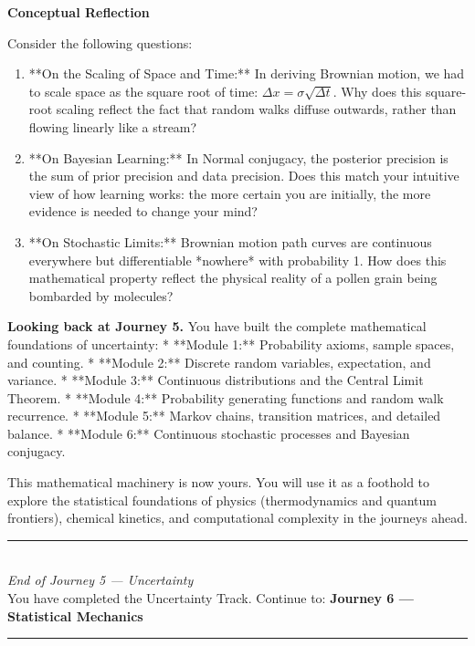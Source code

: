 \documentclass[12pt, a4paper]{article}
\begin{document}
\begin{reflectionbox}
\textbf{Conceptual Reflection}

Consider the following questions:
\begin{enumerate}
  \item **On the Scaling of Space and Time:** In deriving Brownian motion, we had to scale space as the square root of time: $\Delta x = \sigma \sqrt{\Delta t}$. Why does this square-root scaling reflect the fact that random walks diffuse outwards, rather than flowing linearly like a stream?
  \item **On Bayesian Learning:** In Normal conjugacy, the posterior precision is the sum of prior precision and data precision. Does this match your intuitive view of how learning works: the more certain you are initially, the more evidence is needed to change your mind?
  \item **On Stochastic Limits:** Brownian motion path curves are continuous everywhere but differentiable *nowhere* with probability 1. How does this mathematical property reflect the physical reality of a pollen grain being bombarded by molecules?
\end{enumerate}
\end{reflectionbox}

\medskip
\noindent\textbf{Looking back at Journey 5.}
You have built the complete mathematical foundations of uncertainty:
* **Module 1:** Probability axioms, sample spaces, and counting.
* **Module 2:** Discrete random variables, expectation, and variance.
* **Module 3:** Continuous distributions and the Central Limit Theorem.
* **Module 4:** Probability generating functions and random walk recurrence.
* **Module 5:** Markov chains, transition matrices, and detailed balance.
* **Module 6:** Continuous stochastic processes and Bayesian conjugacy.

This mathematical machinery is now yours. You will use it as a foothold to explore the statistical foundations of physics (thermodynamics and quantum frontiers), chemical kinetics, and computational complexity in the journeys ahead.

\vspace{1.4cm}
\begin{center}
{\color{MidBlue}\rule{0.5\linewidth}{0.8pt}}\\[6pt]
{\small\color{DarkGrey}\textit{End of Journey 5 --- Uncertainty}}\\[4pt]
{\small\color{DarkGrey}You have completed the Uncertainty Track. Continue to: \textbf{Journey 6 --- Statistical Mechanics}}\\[6pt]
{\color{MidBlue}\rule{0.5\linewidth}{0.8pt}}
\end{center}
\end{document}
